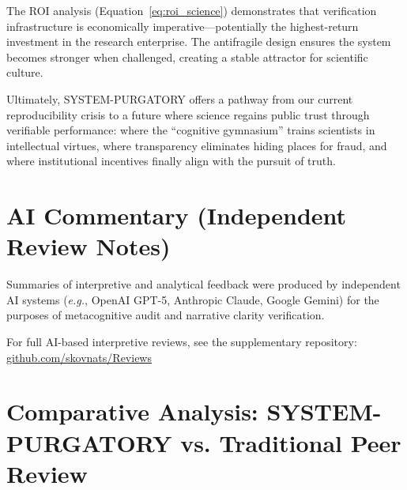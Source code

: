 \documentclass[11pt,a4paper]{article}
\begin{document}
The ROI analysis (Equation~\eqref{eq:roi_science}) demonstrates that verification infrastructure is economically imperative—potentially the highest-return investment in the research enterprise. The antifragile design ensures the system becomes stronger when challenged, creating a stable attractor for scientific culture.

Ultimately, SYSTEM-PURGATORY offers a pathway from our current reproducibility crisis to a future where science regains public trust through verifiable performance: where the ``cognitive gymnasium'' trains scientists in intellectual virtues, where transparency eliminates hiding places for fraud, and where institutional incentives finally align with the pursuit of truth.

\section*{AI Commentary (Independent Review Notes)}
Summaries of interpretive and analytical feedback were produced by independent AI systems 
(\textit{e.g.}, OpenAI GPT-5, Anthropic Claude, Google Gemini) 
for the purposes of metacognitive audit and narrative clarity verification.  

For full AI-based interpretive reviews, see the supplementary repository:  
\href{https://codeberg.org/skovnats/SVE-Systemic-Verification-Engineering/tree/master/Reviews}{github.com/skovnats/Reviews}





\clearpage
\appendix


\section{Comparative Analysis: SYSTEM-PURGATORY vs. Traditional Peer Review}
\label{app:comparison}
\end{document}
